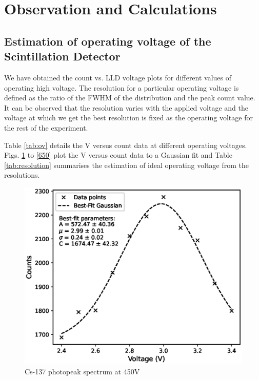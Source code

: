 \section{Observation and Calculations}

\subsection{Estimation of operating voltage of the Scintillation Detector}
We have obtained the count vs. LLD voltage plots for different values of operating high voltage. The resolution for a particular operating voltage is defined as the ratio of the FWHM of the distribution and the peak count value. It can be observed that the resolution varies with the applied voltage and the voltage at which we get the best resolution is fixed as the operating voltage for the rest of the experiment.

Table \ref{tab:ov} details the V versus count data at different operating voltages. Figs. \ref{450} to \ref{650} plot the V versus count data to a Gaussian fit and Table \ref{tab:resolution} summarises the estimation of ideal operating voltage from the resolutions. 



\begin{figure}[H]
    \centering
    \includegraphics[width=1\columnwidth]{images/450.eps}
    \caption{Cs-137 photopeak spectrum at 450V}
    \label{450}
\end{figure}

